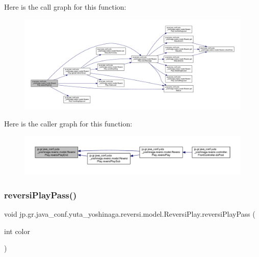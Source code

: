 Here is the call graph for this function\+:
\nopagebreak
\begin{figure}[H]
\begin{center}
\leavevmode
\includegraphics[width=350pt]{classjp_1_1gr_1_1java__conf_1_1yuta__yoshinaga_1_1reversi_1_1model_1_1_reversi_play_abd208c350d3713ef6872faaa813ac8c3_cgraph}
\end{center}
\end{figure}
Here is the caller graph for this function\+:
\nopagebreak
\begin{figure}[H]
\begin{center}
\leavevmode
\includegraphics[width=350pt]{classjp_1_1gr_1_1java__conf_1_1yuta__yoshinaga_1_1reversi_1_1model_1_1_reversi_play_abd208c350d3713ef6872faaa813ac8c3_icgraph}
\end{center}
\end{figure}
\mbox{\label{classjp_1_1gr_1_1java__conf_1_1yuta__yoshinaga_1_1reversi_1_1model_1_1_reversi_play_acf3c99fcbff26d65f7b12f99d69ab88d}} 
\subsubsection{\texorpdfstring{reversi\+Play\+Pass()}{reversiPlayPass()}}
{\footnotesize\ttfamily void jp.\+gr.\+java\+\_\+conf.\+yuta\+\_\+yoshinaga.\+reversi.\+model.\+Reversi\+Play.\+reversi\+Play\+Pass (\begin{DoxyParamCaption}\item[{int}]{color }\end{DoxyParamCaption})}



